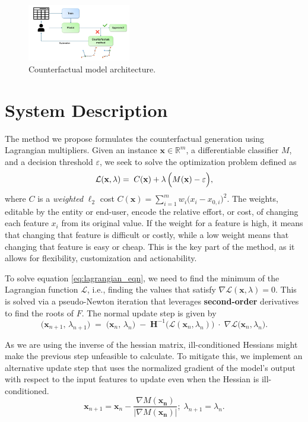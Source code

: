\documentclass[12pt]{extarticle}
\numberwithin{equation}{section}
\begin{document}
\begin{figure}[H]
    \centering
    \includegraphics[width=0.4\textwidth]{images/diagram}
    \caption{Counterfactual model architecture.}
\end{figure}

\section*{System Description}
The method we propose formulates the counterfactual generation using Lagrangian multipliers. Given an instance $\mathbf{x}\! \in\! \mathbb{R}^m$, a differentiable classifier $M$, and a decision threshold $\varepsilon$, we seek to solve the optimization problem defined as
\begin{equation}
\label{eq:lagrangian_eqn}
\mathcal{L}(\mathbf{x}, \lambda) = \; C(\mathbf{x}) + \lambda \, \Bigl(M(\mathbf{x}) - \varepsilon \Bigr),
\end{equation}
where $C$ is a \emph{weighted} $\ell_2$ cost $C(\mathbf{x}) = \sum_{i=1}^m w_i\bigl(x_i - x_{0,i}\bigr)^2$. The weights, editable by the entity or end-user, encode the relative effort, or cost, of changing each feature $x_i$ from its original value. If the weight for a feature is high, it means that changing that feature is difficult or costly, while a low weight means that changing that feature is easy or cheap. This is the key part of the method, as it allows for flexibility, customization and actionability. 

To solve equation \ref{eq:lagrangian_eqn}, we need to find the minimum of the Lagrangian function $\mathcal{L}$, i.e., finding the values that satisfy $\nabla \mathcal{L}(\mathbf{x}, \lambda) = 0$. This is solved via a pseudo-Newton iteration that leverages \textbf{second-order} derivatives to find the roots of $F$. The normal update step is given by
\[
\bigl(\mathbf{x}_{n+1},\,\lambda_{n+1}\bigr)
\;=\;
\bigl(\mathbf{x}_n,\,\lambda_n\bigr)
\;-\;
\mathbf{H}^{-1}\!\bigl(\mathcal{L}(\mathbf{x}_n,\lambda_n)\bigr)
\;\cdot\;
\nabla\mathcal{L}\bigl(\mathbf{x}_n,\lambda_n\bigr).
\]

As we are using the inverse of the hessian matrix, ill-conditioned Hessians might make the previous step unfeasible to calculate. To mitigate this, we implement an alternative update step that uses the normalized gradient of the model's output with respect to the input features to update even when the Hessian is ill-conditioned.
\[
    \mathbf{x}_{n+1} = \mathbf{x}_n - \frac{\nabla M(\mathbf{x_n})}{|\nabla M(\mathbf{x_n})|};\;
    \lambda_{n+1} = \lambda_n.
\]
\end{document}
